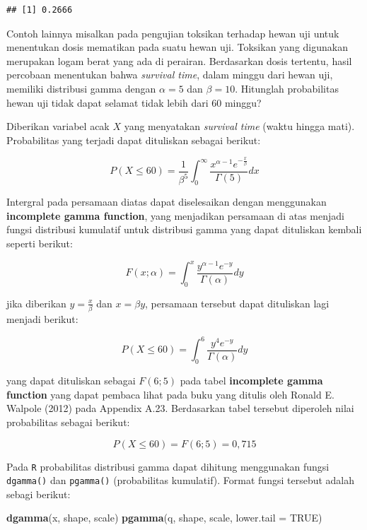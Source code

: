 \documentclass[]{book}
\newenvironment{Shaded}{\begin{snugshade}}{\end{snugshade}}
\newcommand{\KeywordTok}[1]{\textcolor[rgb]{0.13,0.29,0.53}{\textbf{#1}}}
\newcommand{\DataTypeTok}[1]{\textcolor[rgb]{0.13,0.29,0.53}{#1}}
\newcommand{\OtherTok}[1]{\textcolor[rgb]{0.56,0.35,0.01}{#1}}
\newcommand{\NormalTok}[1]{#1}
\begin{document}
\begin{verbatim}
## [1] 0.2666
\end{verbatim}

Contoh lainnya misalkan pada pengujian toksikan terhadap hewan uji untuk
menentukan dosis mematikan pada suatu hewan uji. Toksikan yang digunakan
merupakan logam berat yang ada di perairan. Berdasarkan dosis tertentu,
hasil percobaan menentukan bahwa \emph{survival time}, dalam minggu dari
hewan uji, memiliki distribusi gamma dengan \(\alpha=5\) dan
\(\beta=10\). Hitunglah probabilitas hewan uji tidak dapat selamat tidak
lebih dari 60 minggu?

Diberikan variabel acak \(X\) yang menyatakan \emph{survival time}
(waktu hingga mati). Probabilitas yang terjadi dapat dituliskan sebagai
berikut:

\[
P\left(X\le60\right)=\frac{1}{\beta^5}\int_0^{\infty}\frac{x^{\alpha-1}e^{-\frac{x}{\beta}}}{\Gamma\left(5\right)}dx
\]

Intergral pada persamaan diatas dapat diselesaikan dengan menggunakan
\textbf{incomplete gamma function}, yang menjadikan persamaan di atas
menjadi fungsi distribusi kumulatif untuk distribusi gamma yang dapat
dituliskan kembali seperti berikut:

\[
F\left(x;\alpha\right)=\int_0^x\frac{y^{\alpha-1}e^{-y}}{\Gamma\left(\alpha\right)}dy
\]

jika diberikan \(y=\frac{x}{\beta}\) dan \(x=\beta y\), persamaan
tersebut dapat dituliskan lagi menjadi berikut:

\[
P\left(X\le60\right)=\int_0^6\frac{y^4e^{-y}}{\Gamma\left(\alpha\right)}dy
\]

yang dapat dituliskan sebagai \(F\left(6;5\right)\) pada tabel
\textbf{incomplete gamma function} yang dapat pembaca lihat pada buku
yang ditulis oleh Ronald E. Walpole (2012) pada Appendix A.23.
Berdasarkan tabel tersebut diperoleh nilai probabilitas sebagai berikut:

\[
P\left(X\le60\right)=F\left(6;5\right)=0,715
\]

Pada \texttt{R} probabilitas distribusi gamma dapat dihitung menggunakan
fungsi \texttt{dgamma()} dan \texttt{pgamma()} (probabilitas kumulatif).
Format fungsi tersebut adalah sebagi berikut:

\begin{Shaded}
\begin{Highlighting}[]
\KeywordTok{dgamma}\NormalTok{(x, shape, scale)}
\KeywordTok{pgamma}\NormalTok{(q, shape, scale, }\DataTypeTok{lower.tail =} \OtherTok{TRUE}\NormalTok{)}
\end{Highlighting}
\end{Shaded}
\end{document}
